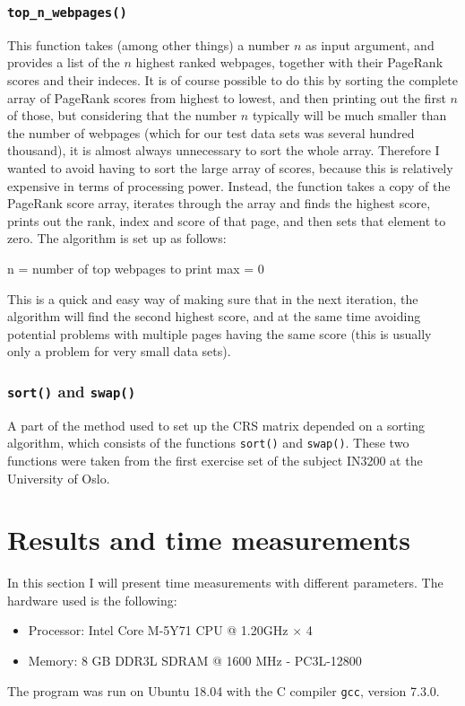 \documentclass[10pt, a4paper]{amsart}
\numberwithin{figure}{section}
\numberwithin{table}{section}
\begin{document}
\subsubsection{\texttt{top\_n\_webpages()}}
This function takes (among other things) a number $n$ as input argument, and provides a list of the $n$ highest ranked webpages, together with their PageRank scores and their indeces. It is of course possible to do this by sorting the complete array of PageRank scores from highest to lowest, and then printing out the first $n$ of those, but considering that the number $n$ typically will be much smaller than the number of webpages (which for our test data sets was several hundred thousand), it is almost always unnecessary to sort the whole array. Therefore I wanted to avoid having to sort the large array of scores, because this is relatively expensive in terms of processing power. Instead, the function takes a copy of the PageRank score array, iterates through the array and finds the highest score, prints out the rank, index and score of that page, and then sets that element to zero. The algorithm is set up as follows:

\begin{algorithm}[H]
\SetAlgoLined
n = number of top webpages to print\;
max = 0\;
\end{algorithm}

This is a quick and easy way of making sure that in the next iteration, the algorithm will find the second highest score, and at the same time avoiding potential problems with multiple pages having the same score (this is usually only a problem for very small data sets).

\subsubsection{\texttt{sort()} and \texttt{swap()}}
A part of the method used to set up the CRS matrix depended on a sorting algorithm, which consists of the functions \texttt{sort()} and \texttt{swap()}. These two functions were taken from the first exercise set of the subject IN3200 at the University of Oslo\cite{exercises}.


\section{Results and time measurements}
In this section I will present time measurements with different parameters. The hardware used is the following:
\begin{itemize}
  \item Processor: Intel Core M-5Y71 CPU @ 1.20GHz $\times$ 4
  \item Memory: 8 GB DDR3L SDRAM @ 1600 MHz - PC3L-12800
\end{itemize}
The program was run on Ubuntu 18.04 with the C compiler \texttt{gcc}, version 7.3.0.
\end{document}
